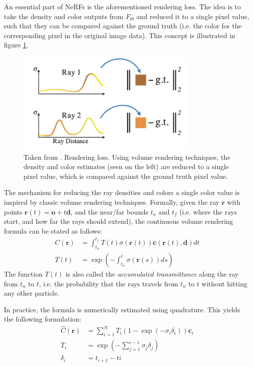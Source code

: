 An essential part of NeRFs is the aforementioned rendering loss. The idea is to take the density and color outputs from $F_\Theta$ and reduced it to a single pixel value, such that they can be compared against the ground truth (i.e. the color for the corresponding pixel in the original image data). This concept is illustrated in figure \ref{fig:nerf_render}.
\begin{figure}[H]
    \centering
    \includegraphics[width=0.8\textwidth]{figures/nerf-render.png}
    \caption{Taken from \cite{nerf2020}. Rendering loss. Using volume rendering techniques, the density and color estimates (seen on the left) are reduced to a single pixel value, which is compared against the ground truth pixel value.}
    \label{fig:nerf_render}
\end{figure}

The mechanism for reducing the ray densities and colors a single color value is inspired by classic volume rendering techniques. Formally, given the ray $\textbf{r}$ with points $\textbf{r}(t) = \textbf{o} + t \textbf{d}$, and the near/far bounds $t_n$ and $t_f$ (i.e. where the rays start, and how far the rays should extend), the continuous volume rendering formula can be stated as follows:
\begin{align}
    C(\textbf{r}) &= \int_{t_n}^{t_f} T(t) \sigma(\textbf{r}(t)) \textbf{c}(\textbf{r}(t), \textbf{d}) dt \\
    T(t) &= \exp \left( - \int_{t_n}^{t} \sigma(\textbf{r}(s)) ds \right)
    \label{eq:render-continuous}
\end{align}
The function $T(t)$ is also called the \textit{accumulated transmittance} along the ray from $t_n$ to $t$, i.e. the probability that the rays travels from $t_n$ to $t$ without hitting any other particle.

In practice, the formula is numerically estimated using quadrature. This yields the following formulation:
\begin{align}
    \hat{C}(\mathbf{r})&=\sum_{i=1}^{N} T_{i}\left(1-\exp \left(-\sigma_{i} \delta_{i}\right)\right) \mathbf{c}_{i} \\
    T_{i}&=\exp \left(-\sum_{j=1}^{i-1} \sigma_{j} \delta_{j}\right) \\
    \delta_i &= t_{i+1} - t{i}
\end{align}

